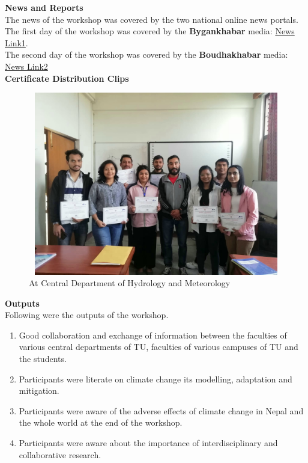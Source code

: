 \documentclass[a4paper,12pt]{report}
\begin{document}
{\bfseries \large News and Reports}\\[3mm]
The news of the workshop was covered by the two national online news portals. The first day of the workshop was covered by the \textbf{Bygankhabar} media: \href{https://bigyankhabar.com/news/466?fbclid=IwZXh0bgNhZW0CMTEAAR2T6N0ZWHThH36HAoFJzrOioSew3a5q9cheBVtr23fTcmynHWW23u9kL7Q_aem_Ab1AITgAqW20AfXdGEopIJzsS-SPnux6ygiMfDMx6DCzY9p1xqf0KG2THdmgxjEKleYf9EwSC_gBVom8hVjHb8Y1}{News Link1}.\\
The second day of the workshop was covered by the \textbf{Boudhakhabar} media:
\href{https://www.boudhakhabar.com/details/5789?fbclid=IwAR3h4kfiercOQEBUr2oSNwfA1fBK4yhx0DEQxMiiGN-5kWbVKvWYWtkgyrw}{News Link2}\\[4mm]

{\bfseries \large Certificate Distribution Clips}\\[3mm]
 \begin{figure}[h!]
  \centering
  \includegraphics[width=12cm, height=8cm]{certificate.jpg}
  \caption{\small At Central Department of Hydrology and Meteorology}
\end{figure}
\clearpage

\vspace*{1.5cm}
{\bfseries \Large Outputs}\\[5mm]
Following were the outputs of the workshop.

\begin{enumerate}
\item Good collaboration and exchange of information between the faculties of various central departments of TU, faculties of various campuses of TU and the students.
\item Participants were literate on climate change its modelling, adaptation and mitigation.
\item Participants were aware of the adverse effects of climate change in Nepal and the whole world at the end of the workshop.
\item Participants were aware about the importance of interdisciplinary and collaborative research.
\end{enumerate}
\end{document}
